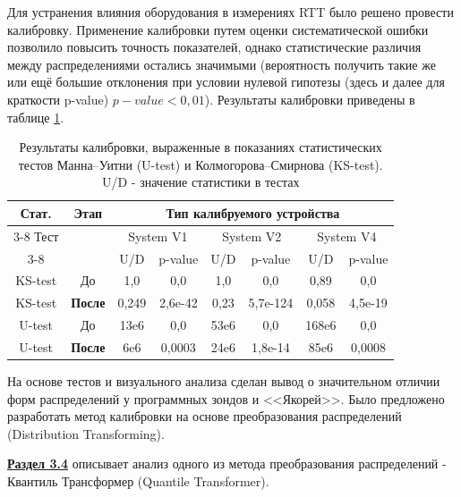 Для устранения влияния оборудования в измерениях RTT было решено провести калибровку. Применение калибровки путем оценки систематической ошибки позволило повысить точность показателей, однако статистические различия между распределениями остались значимыми (вероятность получить такие же или ещё большие отклонения при условии нулевой гипотезы (здесь и далее для краткости p-value) $p-value < 0,01$). 
Результаты калибровки приведены в таблице \ref{calib1}.




\begin{table}[!ht]
	\centering
	\caption{Результаты калибровки, выраженные в показаниях статистических тестов Манна–Уитни (U-test) и Колмогорова–Смирнова (KS-test). U/D - значение статистики в тестах}
	\begin{tabular}{|c|c|c|c|c|c|c|c|}
		\hline
		Стат. & \multirow{3}{*}{Этап} & \multicolumn{6}{c|}{Тип калибруемого устройства} \\ \cline{3-8}
		Тест & & \multicolumn{2}{c|}{System V1} 
		& \multicolumn{2}{c|}{System V2} 
		& \multicolumn{2}{c|}{System V4} \\ \cline{3-8}
		& & U/D & p-value
		& U/D & p-value
		& U/D  & p-value \\ \hline
		KS-test & До              & 1,0        & 0,0        & 1,0         & 0,0         & 0,89        & 0,0        \\ \hline
		KS-test & \textbf{После}  & 0,249      & 2,6e-42    & 0,23        & 5,7e-124    & 0,058       & 4,5e-19    \\ \hline
		U-test  & До              & 13e6       & 0,0        & 53e6        & 0,0         & 168e6       & 0,0        \\ \hline
		U-test  & \textbf{После}  & 6e6        & 0,0003     & 24e6        & 1,8e-14     & 85e6        & 0,0008     \\ \hline
	\end{tabular}
	\label{calib1}
\end{table}

На основе тестов и визуального анализа сделан вывод о значительном отличии форм распределений у программных зондов и <<Якорей>>. Было предложено разработать метод калибровки на основе преобразования распределений (Distribution Transforming).


\underline{\textbf{Раздел 3.4}} описывает анализ одного из метода преобразования распределений - Квантиль Трансформер (Quantile Transformer).


